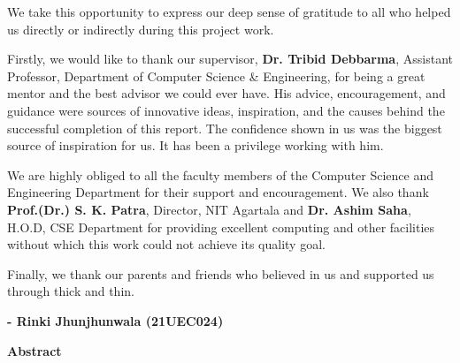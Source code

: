 \documentclass{nitathesis}
\begin{document}
\begin{acknowledgements}
    We take this opportunity to express our deep sense of gratitude to all who helped us directly or indirectly during this project work.

    Firstly, we would like to thank our supervisor, \textbf{Dr. Tribid Debbarma}, Assistant Professor, Department of Computer Science \& Engineering, for being a great mentor and the best advisor we could ever have. His advice, encouragement, and guidance were sources of innovative ideas, inspiration, and the causes behind the successful completion of this report. The confidence shown in us was the biggest source of inspiration for us. It has been a privilege working with him.

    We are highly obliged to all the faculty members of the Computer Science and Engineering Department for their support and encouragement. We also thank \textbf{Prof.(Dr.) S. K. Patra}, Director, NIT Agartala and \textbf{Dr. Ashim Saha}, H.O.D, CSE Department for providing excellent computing and other facilities without which this work could not achieve its quality goal.

    Finally, we thank our parents and friends who believed in us and supported us through thick and thin.
    
    \vspace{1.5in}
    \begin{flushright}
        \textbf{- Rinki Jhunjhunwala (21UEC024)}
    \end{flushright}
\end{acknowledgements}

\cleardoublepage
{}
{}
\listoffigures

\cleardoublepage
{}
{}
\listoftables

\cleardoublepage
{}
{}
\begin{center}
    {\Large \textbf{Abstract}\par}
    \vspace{0.4in}
\end{center}
\end{document}
